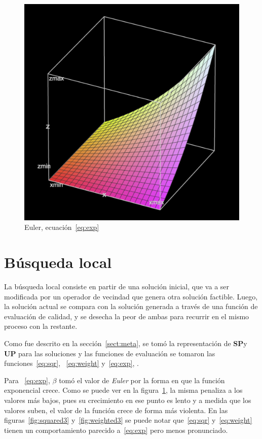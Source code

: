 \documentclass{ci5652}
\begin{document}
\begin{figure}[p]
	\centering
	\includegraphics[width=\linewidth]{euler-3b}
	\caption{Euler, ecuación~\ref{eq:exp}}
	\label{fig:euler3}
\end{figure}

\section{Búsqueda local}\label{sect:ls}

La búsqueda local consiste en partir de una solución inicial, que va a ser modificada por un operador de vecindad que genera otra solución factible. Luego, la solución actual se compara con la solución generada a través de una función de evaluación de calidad, y se desecha la peor de ambas para recurrir en el mismo proceso con la restante.

Como fue descrito en la sección~\ref{sect:meta}, se tomó la representación de \textbf{SP}y \textbf{UP} para las soluciones y las funciones de evaluación se tomaron las funciones~\ref{eq:sqr}, ~\ref{eq:weight} y~\ref{eq:exp}, .

Para ~\ref{eq:exp}, $\beta$ tomó el valor de \textit{Euler} por la forma en que la función exponencial crece. Como se puede ver en la figura~\ref{fig:euler3}, la misma penaliza a los valores más bajos, pues su crecimiento en ese punto es lento y a medida que los valores suben, el valor de la función crece de forma más violenta. En las figuras~\ref{fig:squared3} y~\ref{fig:weighted3} se puede notar que~\ref{eq:sqr} y~\ref{eq:weight} tienen un comportamiento parecido a~\ref{eq:exp} pero menos pronunciado. 
\end{document}
